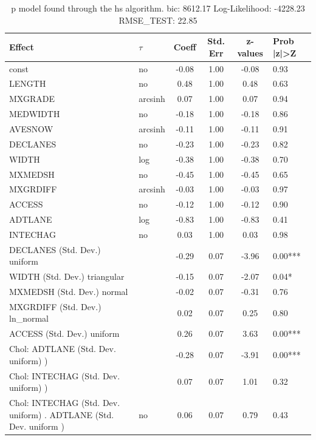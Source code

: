 \begin{table}
	\caption{p model found through the hs algorithm. bic: 8612.17 Log-Likelihood: -4228.23 RMSE_TEST: 22.85}
	\begin{center}
		\begin{tabular}{|l|l|c|c|c|l|}
			\hline
			Effect & $\tau$ & Coeff & Std. Err & z-values & Prob |z|>Z \\
			\hline
			const & no & -0.08 & 1.00 & -0.08 & 0.93 \\
			\hline
			LENGTH & no & 0.48 & 1.00 & 0.48 & 0.63 \\
			\hline
			MXGRADE & arcsinh & 0.07 & 1.00 & 0.07 & 0.94 \\
			\hline
			MEDWIDTH & no & -0.18 & 1.00 & -0.18 & 0.86 \\
			\hline
			AVESNOW & arcsinh & -0.11 & 1.00 & -0.11 & 0.91 \\
			\hline
			DECLANES & no & -0.23 & 1.00 & -0.23 & 0.82 \\
			\hline
			WIDTH & log & -0.38 & 1.00 & -0.38 & 0.70 \\
			\hline
			MXMEDSH & no & -0.45 & 1.00 & -0.45 & 0.65 \\
			\hline
			MXGRDIFF & arcsinh & -0.03 & 1.00 & -0.03 & 0.97 \\
			\hline
			ACCESS & no & -0.12 & 1.00 & -0.12 & 0.90 \\
			\hline
			ADTLANE & log & -0.83 & 1.00 & -0.83 & 0.41 \\
			\hline
			INTECHAG & no & 0.03 & 1.00 & 0.03 & 0.98 \\
			\hline
			DECLANES (Std. Dev.) uniform &  & -0.29 & 0.07 & -3.96 & 0.00*** \\
			\hline
			WIDTH (Std. Dev.) triangular &  & -0.15 & 0.07 & -2.07 & 0.04* \\
			\hline
			MXMEDSH (Std. Dev.) normal &  & -0.02 & 0.07 & -0.31 & 0.76 \\
			\hline
			MXGRDIFF (Std. Dev.) ln_normal &  & 0.02 & 0.07 & 0.25 & 0.80 \\
			\hline
			ACCESS (Std. Dev.) uniform &  & 0.26 & 0.07 & 3.63 & 0.00*** \\
			\hline
			 Chol: ADTLANE (Std. Dev. uniform) ) &  & -0.28 & 0.07 & -3.91 & 0.00*** \\
			\hline
			 Chol: INTECHAG (Std. Dev. uniform) ) &  & 0.07 & 0.07 & 1.01 & 0.32 \\
			\hline
			 Chol: INTECHAG (Std. Dev. uniform) . ADTLANE (Std. Dev.   uniform ) & no & 0.06 & 0.07 & 0.79 & 0.43 \\

\end{tabular}
\end{center}
\end{table}
